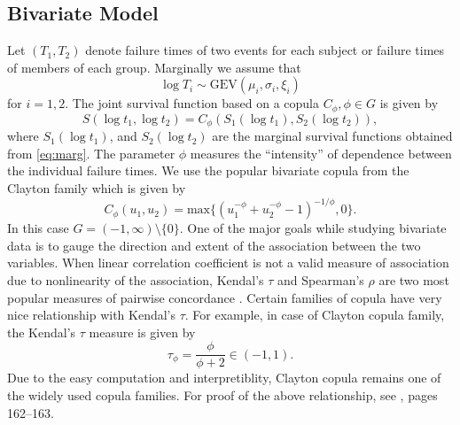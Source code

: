 \documentclass[11pt]{article}
\theoremstyle{remboldstyle}
\begin{document}
\subsection{Bivariate Model}
\noindent
Let $(T_1, T_2)$ denote failure times of two events for each subject or failure times
of members of each group. Marginally we assume that
\begin{equation}
  \label{eq:marg}
\log T_i \sim \mbox{GEV} (\mu_i, \sigma_i, \xi_i)
\end{equation}
for $i= 1,2$. The joint survival function based on a copula $C_{\phi}, \phi \in G$ is given by
\begin{equation}
  \label{eq:survcop}
  S(\log t_1, \log t_2) = C_\phi (S_1(\log t_1), S_2(\log t_2)),
\end{equation}
where $S_1(\log t_1)$, and $S_2(\log t_2)$ are the marginal survival functions obtained from \eqref{eq:marg}. The parameter $\phi$ measures the ``intensity'' of dependence between the individual failure
times. We use the popular bivariate copula from the Clayton family which is given by
\begin{equation}
  \label{eq:clay}
  C_\phi (u_1, u_2) = \mbox{max} \{(u_1^{-\phi} + u_2^{-\phi} - 1)^{-1/\phi}, 0\} .
\end{equation}
In this case $G= (-1, \infty)\setminus \{0\}$. One of the major goals while studying bivariate data is to gauge the direction and extent of the association between the two variables. When linear correlation coefficient is not a valid measure of association due to nonlinearity of the association, Kendal's $\tau$ and Spearman's $\rho$ are two most popular measures of pairwise concordance \cite[][chapter 5]{nelson:1999}. Certain families of copula have very nice relationship with Kendal's $\tau$. For example, in case of Clayton copula family, the Kendal's $\tau$ measure is given by
\[
\tau_\phi = \frac{\phi}{\phi+2} \in (-1,1).
\]
Due to the easy computation and interpretiblity, Clayton copula remains one of the widely used copula families. 
For proof of the above relationship, see \cite{nelson:1999}, pages 162--163.
\end{document}
